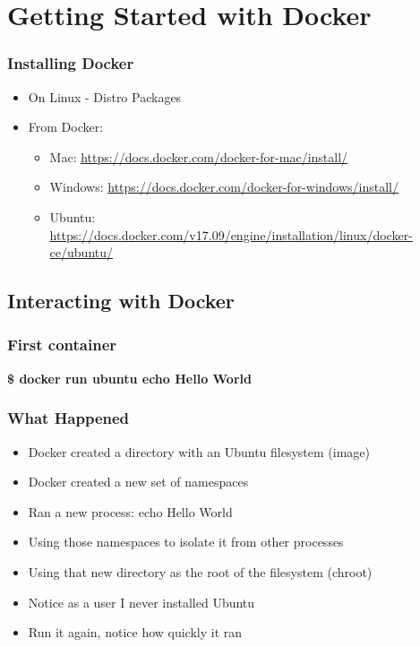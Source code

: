 \documentclass[aspectratio=169,11pt,hyperref={colorlinks=true}]{beamer}
\begin{document}
\section{Getting Started with Docker}
\begin{frame}
    \frametitle{Installing Docker}
    \begin{itemize}
        \item On Linux - Distro Packages
        \item From Docker:
            \begin{itemize}
                \item Mac: \href{https://docs.docker.com/docker-for-mac/install/}{https://docs.docker.com/docker-for-mac/install/}
                \item Windows: \href{https://docs.docker.com/docker-for-windows/install/}{https://docs.docker.com/docker-for-windows/install/}
                \item Ubuntu: \href{https://docs.docker.com/v17.09/engine/installation/linux/docker-ce/ubuntu/}{https://docs.docker.com/v17.09/engine/installation/linux/docker-ce/ubuntu/}
            \end{itemize}
    \end{itemize}
\end{frame}

\subsection{Interacting with Docker}
\begin{frame}
    \frametitle{First container}
    {\LARGE \textbf{\$ docker run ubuntu echo Hello World}} \\
\end{frame}

\begin{frame}
    \frametitle{What Happened}
    \begin{itemize}
        \item Docker created a directory with an Ubuntu filesystem (image)
        \item Docker created a new set of namespaces
        \item Ran a new process: echo Hello World
        \item Using those namespaces to isolate it from other processes
        \item Using that new directory as the root of the filesystem (chroot)
        \item Notice as a user I never installed Ubuntu
        \item Run it again, notice how quickly it ran
    \end{itemize}
\end{frame}
\end{document}
